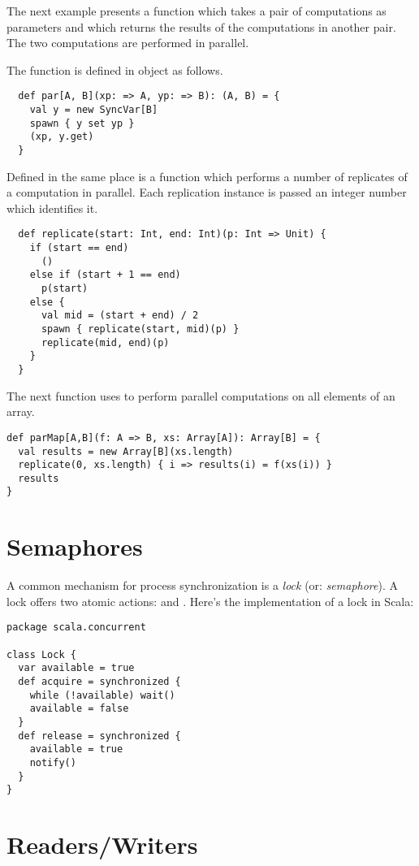 {The next example presents a function  which takes a pair of
computations as parameters and which returns the results of the computations
in another pair. The two computations are performed in parallel.

The function is defined in object
 as follows.
\begin{lstlisting}
  def par[A, B](xp: => A, yp: => B): (A, B) = {
    val y = new SyncVar[B]
    spawn { y set yp }
    (xp, y.get)
  }
\end{lstlisting}
Defined in the same place is a function  which performs a
number of replicates of a computation in parallel. Each
replication instance is passed an integer number which identifies it.
\begin{lstlisting}
  def replicate(start: Int, end: Int)(p: Int => Unit) {
    if (start == end)
      ()
    else if (start + 1 == end)
      p(start)
    else {
      val mid = (start + end) / 2
      spawn { replicate(start, mid)(p) }
      replicate(mid, end)(p)
    }
  }
\end{lstlisting}

The next function uses  to perform parallel
computations on all elements of an array.

\begin{lstlisting}
def parMap[A,B](f: A => B, xs: Array[A]): Array[B] = {
  val results = new Array[B](xs.length)
  replicate(0, xs.length) { i => results(i) = f(xs(i)) }
  results
}
\end{lstlisting}

\section{Semaphores}

A common mechanism for process synchronization is a {\em lock} (or:
{\em semaphore}). A lock offers two atomic actions:  and
. Here's the implementation of a lock in Scala:

\begin{lstlisting}
package scala.concurrent

class Lock {
  var available = true
  def acquire = synchronized {
    while (!available) wait()
    available = false
  }
  def release = synchronized {
    available = true
    notify()
  }
}
\end{lstlisting}

\section{Readers/Writers}

}
